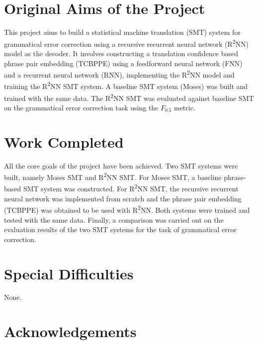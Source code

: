 \documentclass[12pt,a4paper,twoside,openright]{report}
\begin{document}

\section*{Original Aims of the Project}
This project aims to build a statistical machine translation (SMT) system for grammatical error correction using a recursive recurrent neural network (R\textsuperscript{2}NN) model as the decoder. It involves constructing a translation confidence based phrase pair embedding (TCBPPE) using a feedforward neural network (FNN) and a recurrent neural network (RNN), implementing the R\textsuperscript{2}NN model and training the R\textsuperscript{2}NN SMT system. A baseline SMT system (Moses) was built and trained with the same data. The R\textsuperscript{2}NN SMT was evaluated against baseline SMT on the grammatical error correction task using the $F_{0.5}$ metric.

\section*{Work Completed}
All the core goals of the project have been achieved. Two SMT systems were built, namely Moses SMT and R\textsuperscript{2}NN SMT. For Moses SMT, a baseline phrase-based SMT system was constructed. For R\textsuperscript{2}NN SMT, the recursive recurrent neural network was implemented from scratch and the phrase pair embedding (TCBPPE) was obtained to be used with R\textsuperscript{2}NN. Both systems were trained and tested with the same data. Finally, a comparison was carried out on the evaluation results of the two SMT systems for the task of grammatical error correction.

\section*{Special Difficulties}
None.

\section*{Acknowledgements}


\tableofcontents

\listoffigures


\pagestyle{headings}
\end{document}
